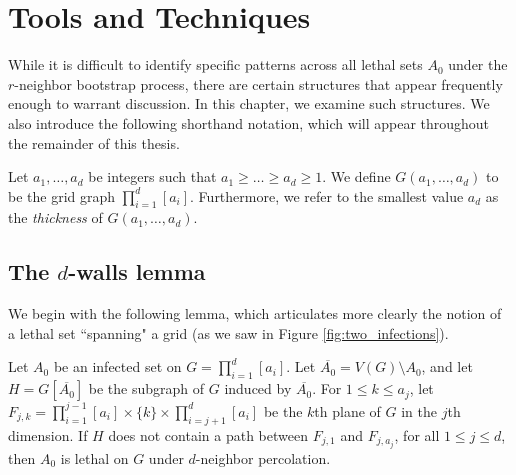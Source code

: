 \chapter{Tools and Techniques}

While it is difficult to identify specific patterns across all lethal sets $A_0$ under the $r$-neighbor bootstrap process, there are certain structures that appear frequently enough to warrant discussion. In this chapter, we examine such structures. We also introduce the following shorthand notation, which will appear throughout the remainder of this thesis. 

\begin{defn}
\label{defn:thickness}
Let $a_1, \dots, a_d$ be integers such that $a_1 \geq \dots \geq a_d \geq 1$. We define $G(a_1, \dots, a_d)$ to be the grid graph $\prod_{i=1}^d [a_i]$. Furthermore, we refer to the smallest value $a_d$ as the \emph{thickness} of $G(a_1, \dots, a_d)$.
\end{defn}

\section{The $d$-walls lemma}

We begin with the following lemma, which articulates more clearly the notion of a lethal set ``spanning" a grid (as we saw in Figure \ref{fig:two_infections}).

\begin{lem}
\label{lem:walls}
Let $A_0$ be an infected set on $G = \prod_{i=1}^d [a_i]$. Let $\overline{A_0} = V(G) \setminus A_0$, and let $H = G[\overline{A_0}]$ be the subgraph of $G$ induced by $\overline{A_0}$. For $1 \leq k \leq a_j$, let $F_{j,k} = \prod_{i=1}^{j-1} [a_i] \times \{k\} \times \prod_{i=j+1}^{d} [a_i]$ be the $k$th plane of $G$ in the $j$th dimension. If $H$ does not contain a path between $F_{j,1}$ and $F_{j,a_j}$, for all $1 \leq j \leq d$, then $A_0$ is lethal on $G$ under $d$-neighbor percolation.
\end{lem}

